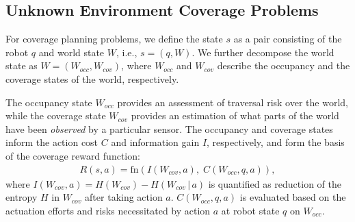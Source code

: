\documentclass[letterpaper]{article} %
\newcommand{\phdone}[1]{} %
\begin{document}
\subsection{Unknown Environment Coverage Problems}

\phdone{Coverage Problem}
For coverage planning problems, we define the state $s$ as a pair consisting of the robot $q$ and world state $W$, i.e., $s = (q, W)$.
We further decompose the world state as $W = (W_{occ}, W_{cov})$, where $W_{occ}$ and $W_{cov}$ describe the occupancy and the coverage states of the world, respectively.

The occupancy state $W_{occ}$ provides an assessment of traversal risk over the world, while the coverage state $W_{cov}$ provides an estimation of what parts of the world have been \textit{observed} by a particular sensor. The occupancy and coverage states inform the action cost $C$ and information gain $I$, respectively, and form the basis of the coverage reward function:
\begin{align}
  R(s, a) = \mathrm{fn}(I(W_{cov}, a),\; C(W_{occ}, q, a)),
  \label{eq:coverage_reward}
\end{align}
where $I(W_{cov}, a) = H(W_{cov}) - H(W_{cov} \,|\, a)$ is quantified as reduction of the entropy $H$ in $W_{cov}$ after taking action $a$. $C(W_{occ}, q, a)$ is evaluated based on the actuation efforts and risks necessitated by action $a$ at robot state $q$ on $W_{occ}$.
\end{document}

